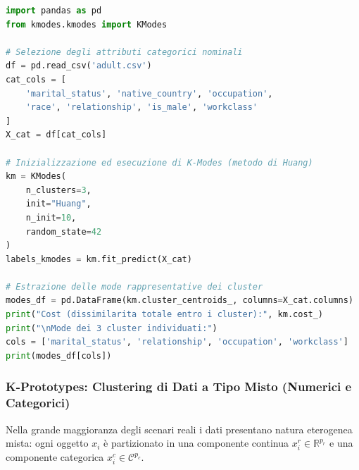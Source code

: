 \begin{lstlisting}[language=Python, caption={Clustering categorico con l'algoritmo K-Modes.}]
import pandas as pd
from kmodes.kmodes import KModes

# Selezione degli attributi categorici nominali
df = pd.read_csv('adult.csv')
cat_cols = [
    'marital_status', 'native_country', 'occupation',
    'race', 'relationship', 'is_male', 'workclass'
]
X_cat = df[cat_cols]

# Inizializzazione ed esecuzione di K-Modes (metodo di Huang)
km = KModes(
    n_clusters=3,
    init="Huang",
    n_init=10,
    random_state=42
)
labels_kmodes = km.fit_predict(X_cat)

# Estrazione delle mode rappresentative dei cluster
modes_df = pd.DataFrame(km.cluster_centroids_, columns=X_cat.columns)
print("Cost (dissimilarita totale entro i cluster):", km.cost_)
print("\nMode dei 3 cluster individuati:")
cols = ['marital_status', 'relationship', 'occupation', 'workclass']
print(modes_df[cols])
\end{lstlisting}

\FloatBarrier
\subsubsection{K-Prototypes: Clustering di Dati a Tipo Misto (Numerici e Categorici)}
\label{subsec:lab-kprototypes}

Nella grande maggioranza degli scenari reali i dati presentano natura eterogenea mista: ogni oggetto $x_i$ è partizionato in una componente continua $x_i^r \in \mathbb{R}^{p_r}$ e una componente categorica $x_i^c \in \mathcal{C}^{p_c}$. 

